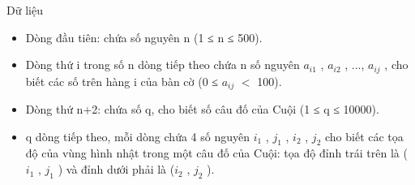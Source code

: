 Dữ liệu
\begin{itemize}
	\item Dòng đầu tiên: chứa số nguyên n (1 ≤ n ≤ 500).
	\item Dòng thứ i trong số n dòng tiếp theo chứa n số nguyên $a_{i1}$ , $a_{i2}$ , ..., $a_{ij}$ , cho biết các số trên hàng i của bàn cờ (0 ≤ $a_{ij}$ $<$ 100).
	\item Dòng thứ n+2: chứa số q, cho biết số câu đố của Cuội (1 ≤ q ≤ 10000).
	\item q dòng tiếp theo, mỗi dòng chứa 4 số nguyên $i_{1}$ , $j_{1}$ , $i_{2}$ , $j_{2}$ cho biết các tọa độ của vùng hình nhật trong một câu đố của Cuội: tọa độ đỉnh trái trên là ($i_{1}$ , $j_{1}$ ) và đỉnh dưới phải là ($i_{2}$ , $j_{2}$ ).
\end{itemize}